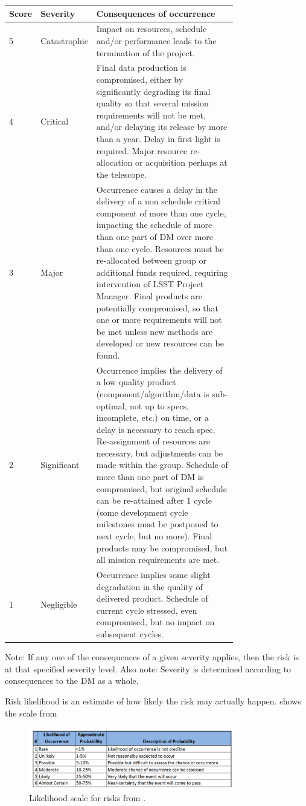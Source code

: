 \begin{tabular}{|l|l|p{0.75\linewidth}|} \hline
Score & Severity & Consequences of occurrence \\ \hline
5 & Catastrophic & Impact on resources, schedule and/or performance leads to the termination of the project. \\ \hline
4 & Critical & Final data production is compromised, either by significantly degrading its final quality so that several mission requirements will not be met,
and/or delaying its release by more than a year. Delay in first light  is required. Major resource re-allocation or acquisition perhaps at the telescope. \\ \hline
3 & Major & Occurrence causes a delay in the delivery of a non schedule critical component of more than one cycle, impacting the schedule of more than one part of DM over more than one cycle. Resources must be re-allocated between group or additional funds required, requiring intervention of LSST Project Manager. Final products are potentially compromised, so that one or more requirements will not be met unless new methods are developed or new resources can be found. \\ \hline
2 & Significant & Occurrence implies the delivery of a low quality product (component/algorithm/data is sub-optimal, not up to specs, incomplete, etc.) on time, or a delay is necessary to reach spec. Re-assignment of resources are necessary, but adjustments can be made within the group. Schedule of more than one part of DM is compromised, but original schedule can be re-attained after 1 cycle (some development cycle milestones must be postponed to next cycle, but no more). Final products may be compromised, but all mission requirements are met. \\ \hline
1 & Negligible & Occurrence implies some slight degradation in the quality of delivered product. Schedule of current cycle stressed, even compromised, but no impact on subsequent cycles. \\ \hline
\end{tabular}

Note: If any one of the consequences of a given severity applies, then the risk is at that specified severity level.
Also note: Severity is determined according to consequences to the DM as a whole.

Risk likelihood is an estimate of how likely the risk may actually happen.  shows the scale from 

\begin{figure}
\begin{center}
\includegraphics[width=0.8\textwidth]{images/lh}
\caption{Likelihood scale for risks from .\label{fig:lh}}
\end{center}

\end{figure}

